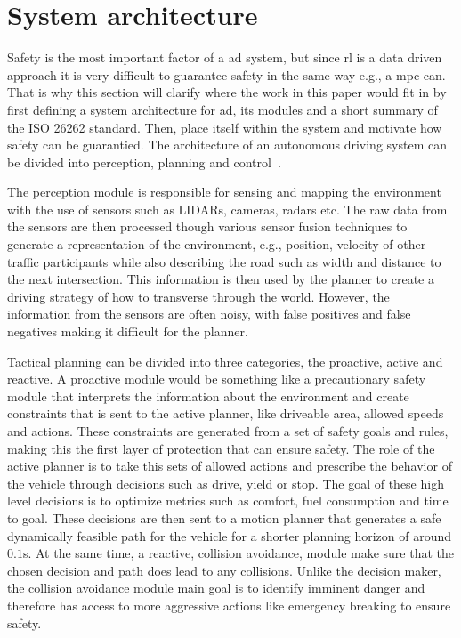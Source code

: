 \section{System architecture}
\label{sec:system_architecture}
Safety is the most important factor of a \gls{ad} system, but since \gls{rl} is a data driven approach it is very difficult to guarantee safety \cite{tbd} in the same way e.g., a \gls{mpc} can. That is why this section will clarify where the work in this paper would fit in by first defining a system architecture for \gls{ad}, its modules and a short summary of the ISO 26262 standard. Then, place itself within the system and motivate how safety can be guarantied. 
The architecture of an autonomous driving system can be divided into perception, planning and control~\cite{Schwarting2018,Kortenkamp2008}.

The perception module is responsible for sensing and mapping the environment with the use of sensors such as LIDARs, cameras, radars etc. The raw data from the sensors are then processed though various sensor fusion techniques to generate a representation of the environment, e.g., position, velocity of other traffic participants while also describing the road such as width and distance to the next intersection. This information is then used by the planner to create a driving strategy of how to transverse through the world. However, the information from the sensors are often noisy, with false positives and false negatives making it difficult for the planner.

Tactical planning can be divided into three categories, the proactive, active and reactive. A proactive module would be something like a precautionary safety module that interprets the information about the environment and create constraints that is sent to the active planner, like  driveable area, allowed speeds and actions. These constraints are generated from a set of safety goals and rules, making this the first layer of protection that can ensure safety. 
The role of the active planner is to take this sets of allowed actions and prescribe the behavior of the vehicle through decisions such as drive, yield or stop. The goal of these high level decisions is to optimize metrics such as comfort, fuel consumption and time to goal. These decisions are then sent to a motion planner that generates a safe dynamically feasible path for the vehicle for a shorter planning horizon of around $0.1$s. 
At the same time, a reactive, collision avoidance, module make sure that the chosen decision and path does lead to any collisions. Unlike the decision maker, the collision avoidance module main goal is to identify imminent danger and therefore has access to more aggressive actions like emergency breaking to ensure safety. 
 
